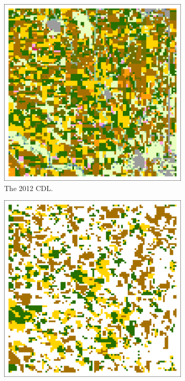 \begin{Spacing}{1.2}
\begin{figure}
  \centering
  \begin{subfigure}[t]{.475\textwidth}
    \includegraphics[width=\textwidth]{Graphics/Testing/clip1_MODIS_CDL.pdf}
    \caption{The 2012 CDL.}
    \label{subfig:ss1r1CDL}
  \end{subfigure}
  \quad
  \begin{subfigure}[t]{.475\textwidth}
    \includegraphics[width=\textwidth]{Graphics/Testing/clip1_MODIS_round1.pdf}

\end{subfigure}
\end{figure}
\end{Spacing}
